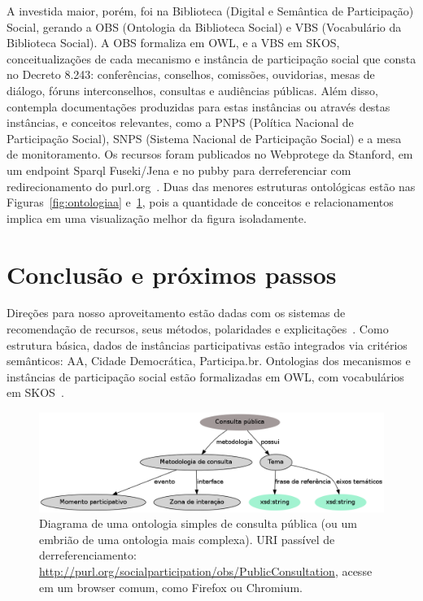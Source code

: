 \documentclass[a4paper, 11pt]{article} %
\begin{document}
A investida maior, porém, foi na Biblioteca (Digital e Semântica de Participação) Social, gerando a OBS (Ontologia da Biblioteca Social) e VBS (Vocabulário da Biblioteca Social). A OBS formaliza em OWL, e a VBS em SKOS, conceitualizações de cada mecanismo e instância de participação social que consta no Decreto 8.243: conferências, conselhos, comissões, ouvidorias, mesas de diálogo, fóruns interconselhos, consultas e audiências públicas. Além disso, contempla documentações produzidas para estas instâncias ou através destas instâncias, e conceitos relevantes, como a PNPS (Política Nacional de Participação Social), SNPS (Sistema Nacional de Participação Social) e a mesa de monitoramento. Os recursos foram publicados no Webprotege da Stanford, em um endpoint Sparql Fuseki/Jena e no pubby para derreferenciar com redirecionamento do purl.org~\cite{pnud5}. Duas das menores estruturas ontológicas estão nas Figuras~\ref{fig:ontologiaa} e~\ref{fig:consulta}, pois a quantidade de conceitos e relacionamentos implica em uma visualização melhor da figura isoladamente.


\section*{Conclusão e próximos passos}

Direções para nosso aproveitamento estão dadas com os sistemas de recomendação de recursos, seus métodos, polaridades e explicitações~\cite{pnud4}. Como estrutura básica, dados de instâncias participativas estão integrados via critérios semânticos: AA, Cidade Democrática, Participa.br. Ontologias dos mecanismos e instâncias de participação social estão formalizadas em OWL, com vocabulários em SKOS~\cite{pnud5}.
\begin{figure}[h!]
  \centering
    \includegraphics[width=1.\textwidth]{obsConsulta.png}
  \caption{\small Diagrama de uma ontologia simples de consulta pública (ou um embrião de uma ontologia mais complexa). URI passível de derreferenciamento: \url{http://purl.org/socialparticipation/obs/PublicConsultation}, acesse em um browser comum, como Firefox ou Chromium.}\label{fig:consulta}
\end{figure}
\end{document}

